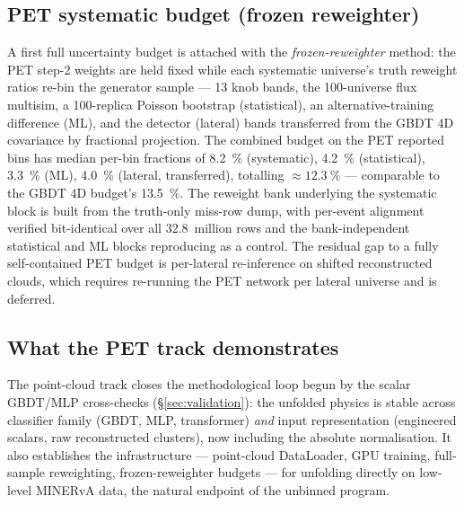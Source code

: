 \subsection{PET systematic budget (frozen reweighter)}
\label{sec:pet-syst}
A first full uncertainty budget is attached with the \emph{frozen-reweighter}
method: the PET step-2 weights are held fixed while each systematic
universe's truth reweight ratios re-bin the generator sample --- 13 knob
bands, the 100-universe flux multisim, a 100-replica Poisson bootstrap
(statistical), an alternative-training difference (ML), and the detector
(lateral) bands transferred from the GBDT 4D covariance by fractional
projection. The combined budget on the PET reported bins has median
per-bin fractions of \SI{8.2}{\percent} (systematic), \SI{4.2}{\percent}
(statistical), \SI{3.3}{\percent} (ML), \SI{4.0}{\percent} (lateral,
transferred), totalling $\approx\SI{12.3}{\percent}$ --- comparable to the
GBDT 4D budget's \SI{13.5}{\percent}. The reweight bank underlying the
systematic block is built from the truth-only miss-row dump, with per-event
alignment verified bit-identical over all \num{32.8}~million rows and the
bank-independent statistical and ML blocks reproducing as a control. The
residual gap to a fully self-contained PET budget is
per-lateral re-inference on shifted reconstructed clouds, which requires
re-running the PET network per lateral universe and is deferred.

\subsection{What the PET track demonstrates}
The point-cloud track closes the methodological loop begun by the scalar
GBDT/MLP cross-checks (\S\ref{sec:validation}): the unfolded physics is
stable across classifier family (GBDT, MLP, transformer) \emph{and} input
representation (engineered scalars, raw reconstructed clusters), now
including the absolute normalisation. It also establishes the
infrastructure --- point-cloud DataLoader, GPU training, full-sample
reweighting, frozen-reweighter budgets --- for unfolding directly on
low-level MINERvA data, the natural endpoint of the unbinned program.
